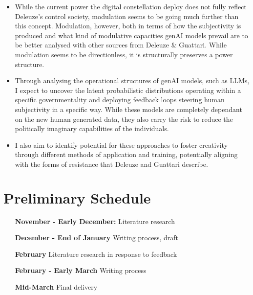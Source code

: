 \begin{itemize}
	\item While the current power the digital constellation deploy does not fully reflect Deleuze's control society, modulation seems to be going much further than this concept. Modulation, however, both in terms of how the subjectivity is produced and what kind of modulative capacities genAI models prevail are to be better analysed with other sources from Deleuze \& Guattari. While modulation seems to be directionless, it is structurally preserves a power structure.
	\item Through analysing the operational structures of genAI models, such as LLMs, I expect to uncover the latent probabilistic distributions operating within a specific governmentality and deploying feedback loops steering human subjectivity in a specific way. While these models are completely dependant on the new human generated data, they also carry the risk to reduce the politically imaginary capabilities of the individuals.
	\item  I also aim to identify potential for these approaches to foster creativity through different methods of application and training, potentially aligning with the forms of resistance that Deleuze and Guattari describe.
\end{itemize}

\section{Preliminary Schedule}
\begin{itemize}
	\item [\textbf{November - Early December:}] Literature research
	\item [\textbf{December - End of January}] Writing process, draft
	\item [\textbf{February}] Literature research in response to feedback
	\item [\textbf{February - Early March}] Writing process
	\item [\textbf{Mid-March}] Final delivery
\end{itemize}


\nocite{wiley2019}
\nocite{amoore2024}
\nocite{bender2021b}
\nocite{brusseau2020}
\nocite{calvo2024}
\nocite{chatterjee2024}
\nocite{cohen2018}
\nocite{dominguezgonzalez2023}
\nocite{gillespie2024}
\nocite{Haggerty2000}
\nocite{hardt2017}
\nocite{hui2015}
\nocite{jiang2024}
\nocite{konik2015}
\nocite{kruger2021}
\nocite{lecun}
\nocite{mackenzie2021}
\nocite{mischke2021c}
\nocite{poster2010}
\nocite{ryan2024}
\nocite{vaswani}
\nocite{Deleuze1992}
\nocite{ettlinger2018}
\nocite{Deleuze1998}
\nocite{wiley2019}

\printbibliography[title={Preliminary Bibliography}]

